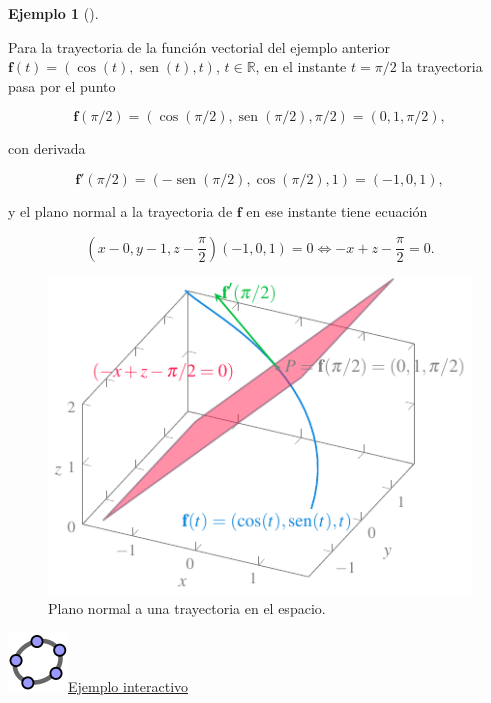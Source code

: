 \documentclass[
  a4paper,
]{scrreport}
\theoremstyle{definition}
\theoremstyle{plain}
\theoremstyle{plain}
\theoremstyle{definition}
\theoremstyle{definition}
\newtheorem{example}{Ejemplo}[chapter]
\theoremstyle{plain}
\theoremstyle{remark}
\begin{document}
\begin{example}[]\protect\hypertarget{exm-plano-normal-trayectoria-espacio}{}\label{exm-plano-normal-trayectoria-espacio}

Para la trayectoria de la función vectorial del ejemplo anterior
\(\mathbf{f}(t)=(\cos(t), \operatorname{sen}(t), t)\),
\(t\in \mathbb{R}\), en el instante \(t=\pi/2\) la trayectoria pasa por
el punto

\[
\mathbf{f}(\pi/2)=(\cos(\pi/2),\operatorname{sen}(\pi/2),\pi/2)=(0,1,\pi/2),
\]

con derivada

\[
\mathbf{f}'(\pi/2)=(-\operatorname{sen}(\pi/2),\cos(\pi/2), 1)=(-1,0,1),
\]

y el plano normal a la trayectoria de \(\mathbf{f}\) en ese instante
tiene ecuación

\[
\left(x-0,y-1,z-\frac{\pi}{2}\right)(-1,0,1) =0 \Leftrightarrow -x+z-\frac{\pi}{2}=0.
\]

\begin{figure}

{\centering \includegraphics{img/funciones-vectoriales/plano-normal-trayectoria-espacio.pdf}

}

\caption{Plano normal a una trayectoria en el espacio.}

\end{figure}

\href{https://www.geogebra.org/m/Q2C7EfBn}{\includegraphics{img/logos/logo-geogebra.png}Ejemplo
interactivo}

\end{example}
\end{document}
